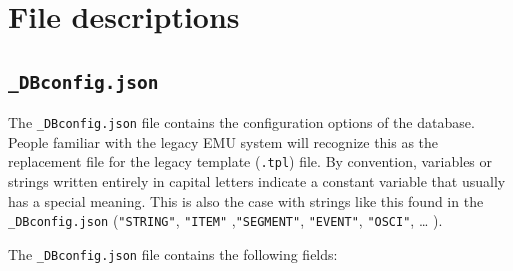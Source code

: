 \documentclass[]{book}
\begin{document}
\hypertarget{file-descriptions}{%
\section{File descriptions}\label{file-descriptions}}

\hypertarget{subsec:app-chapFileFormatsDBconfig}{%
\subsection{\texorpdfstring{\texttt{\_DBconfig.json}}{\_DBconfig.json}}\label{subsec:app-chapFileFormatsDBconfig}}

The \texttt{\_DBconfig.json} file contains the configuration options of the database. People familiar with the legacy EMU system will recognize this as the replacement file for the legacy template (\texttt{.tpl}) file. By convention, variables or strings written entirely in capital letters indicate a constant variable that usually has a special meaning. This is also the case with strings like this found in the \texttt{\_DBconfig.json} (\texttt{"STRING"}, \texttt{"ITEM"} ,\texttt{"SEGMENT"}, \texttt{"EVENT"}, \texttt{"OSCI"}, \ldots{} ).

The \texttt{\_DBconfig.json} file contains the following fields:
\end{document}
